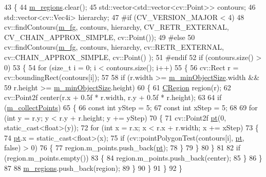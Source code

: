 \begin{DoxyCode}
43 \{
44     \mbox{\hyperlink{class_base_detector_a409c20093acba261db8354ca72058fce}{m\_regions}}.clear();
45     std::vector<std::vector<cv::Point>> contours;
46     std::vector<cv::Vec4i> hierarchy;
47 \textcolor{preprocessor}{#if (CV\_VERSION\_MAJOR < 4)}
48     cv::findContours(\mbox{\hyperlink{class_motion_detector_ac751815be986935ac095aff5428b6c24}{m\_fg}}, contours, hierarchy, CV\_RETR\_EXTERNAL, CV\_CHAIN\_APPROX\_SIMPLE, cv::Point());
49 \textcolor{preprocessor}{#else}
50     cv::findContours(\mbox{\hyperlink{class_motion_detector_ac751815be986935ac095aff5428b6c24}{m\_fg}}, contours, hierarchy, cv::RETR\_EXTERNAL, cv::CHAIN\_APPROX\_SIMPLE, cv::Point()
      );
51 \textcolor{preprocessor}{#endif}
52     \textcolor{keywordflow}{if} (contours.size() > 0)
53     \{
54         \textcolor{keywordflow}{for} (\textcolor{keywordtype}{size\_t} i = 0; i < contours.size(); i++)
55         \{
56             cv::Rect r = cv::boundingRect(contours[i]);
57 
58             \textcolor{keywordflow}{if} (r.width >= \mbox{\hyperlink{class_base_detector_a651b938c89c94daac4763728637d90c9}{m\_minObjectSize}}.width &&
59                 r.height >= \mbox{\hyperlink{class_base_detector_a651b938c89c94daac4763728637d90c9}{m\_minObjectSize}}.height)
60             \{
61                 \mbox{\hyperlink{class_c_region}{CRegion}} region(r);
62                 cv::Point2f center(r.x + 0.5f * r.width, r.y + 0.5f * r.height);
63 
64                 \textcolor{keywordflow}{if} (\mbox{\hyperlink{class_base_detector_a403cbf784fcb960bdb7d080c86c4a2ea}{m\_collectPoints}})
65                 \{
66                     \textcolor{keyword}{const} \textcolor{keywordtype}{int} yStep = 5;
67                     \textcolor{keyword}{const} \textcolor{keywordtype}{int} xStep = 5;
68 
69                     \textcolor{keywordflow}{for} (\textcolor{keywordtype}{int} y = r.y; y < r.y + r.height; y += yStep)
70                     \{
71                         cv::Point2f \mbox{\hyperlink{rings_8cpp_af69bbacaaf68a115b351c5d1e29c3cc8}{pt}}(0, static\_cast<float>(y));
72                         \textcolor{keywordflow}{for} (\textcolor{keywordtype}{int} x = r.x; x < r.x + r.width; x += xStep)
73                         \{
74                             \mbox{\hyperlink{rings_8cpp_af69bbacaaf68a115b351c5d1e29c3cc8}{pt}}.x = \textcolor{keyword}{static\_cast<}\textcolor{keywordtype}{float}\textcolor{keyword}{>}(x);
75                             \textcolor{keywordflow}{if} (cv::pointPolygonTest(contours[i], \mbox{\hyperlink{rings_8cpp_af69bbacaaf68a115b351c5d1e29c3cc8}{pt}}, \textcolor{keyword}{false}) > 0)
76                             \{
77                                 region.m\_points.push\_back(\mbox{\hyperlink{rings_8cpp_af69bbacaaf68a115b351c5d1e29c3cc8}{pt}});
78                             \}
79                         \}
80                     \}
81 
82                     \textcolor{keywordflow}{if} (region.m\_points.empty())
83                     \{
84                         region.m\_points.push\_back(center);
85                     \}
86                 \}
87 
88                 \mbox{\hyperlink{class_base_detector_a409c20093acba261db8354ca72058fce}{m\_regions}}.push\_back(region);
89             \}
90         \}
91     \}
92 \}
\end{DoxyCode}

